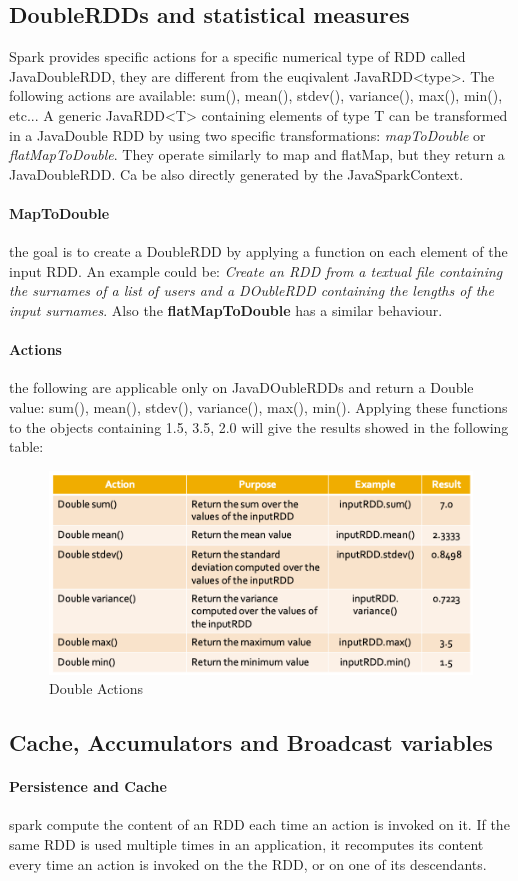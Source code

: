 \documentclass[12pt]{article}
\begin{document}
\subsection{DoubleRDDs and statistical measures}
Spark provides specific actions for a specific numerical type of RDD called JavaDoubleRDD, they are different from the euqivalent JavaRDD<type>. The following actions are available: sum(), mean(), stdev(), variance(), max(), min(), etc... A generic JavaRDD<T> containing elements of type T can be transformed in a JavaDouble RDD by using two specific transformations: \textit{mapToDouble} or \textit{flatMapToDouble}. They operate similarly to map and flatMap, but they return a JavaDoubleRDD. Ca be also directly generated by the JavaSparkContext.
\paragraph{MapToDouble} the goal is to create a DoubleRDD by applying a function on each element of the input RDD. An example could be: \textit{Create an RDD from a textual file containing the surnames of a list of users and a DOubleRDD containing the lengths of the input surnames}. Also the \textbf{flatMapToDouble} has a similar behaviour.
\paragraph{Actions} the following are applicable only on JavaDOubleRDDs and return a Double value: sum(), mean(), stdev(), variance(), max(), min(). Applying these functions to the objects containing {1.5, 3.5, 2.0} will give the results showed in the following table:
\begin{figure}[H]
  \includegraphics[width=\linewidth]{images/DoubleActions.png}
  \caption{Double Actions}
  \label{fig:DoubleActions}
\end{figure}

\subsection{Cache, Accumulators and Broadcast variables}
\paragraph{Persistence and Cache} spark compute the content of an RDD each time an action is invoked on it. If the same RDD is used multiple times in an application, it recomputes its content every time an action is invoked on the the RDD, or on one of its descendants.
\end{document}
